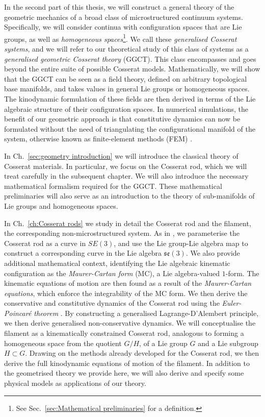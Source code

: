 \documentclass[]{cam-thesis}
\begin{document}
In the second part of this thesis, we will construct a general theory of the geometric mechanics of a broad class of microstructured continuum systems. Specifically, we will consider continua with configuration spaces that are Lie groups, as well as \textit{homogeneous spaces}\footnote{See Sec.~\ref{sec:Mathematical preliminaries} for a definition.}. We call these \textit{generalised Cosserat systems}, and we will refer to our theoretical study of this class of systems as a \textit{generalised geometric Cosserat theory} (GGCT). This class encompasses and goes beyond the entire suite of possible Cosserat models. Mathematically, we will show that the GGCT can be seen as a field theory, defined on arbitrary topological base manifolds, and takes values in general Lie groups or homogeneous spaces. The kinodynamic formulation of these fields are then derived in terms of the Lie algebraic structure of their configuration spaces. In numerical simulations, the benefit of our geometric approach is that constitutive dynamics can now be formulated without the need of triangulating the configurational manifold of the system, otherwise known as finite-element methods (FEM) \citep{hughesFiniteElementMethod2012}. 

In Ch.~\ref{sec:geometry introduction} we will introduce the classical theory of Cosserat materials. In particular, we focus on the Cosserat rod, which we will treat carefully in the subsequent chapter. We will also introduce the necessary mathematical formalism required for the GGCT. These mathematical preliminaries will also serve as an introduction to the theory of sub-manifolds of Lie groups and homogeneous spaces.

In Ch.~\ref{ch:Cosserat rods} we study in detail the Cosserat rod and the filament, the corresponding non-microstructured system. As in \citep{giusteriSimulationViscoelasticCosserat2021, giusteriImportanceEffectivenessRepresenting, chirikjianStochasticElasticaExcludedVolume2008, holmMatrixGstrands2014}, we parameterise the Cosserat rod as a curve in $SE(3)$, and use the Lie group-Lie algebra map to construct a corresponding curve in the Lie algebra $\mathfrak{se}(3)$. We also provide additional mathematical context, identifying the Lie algebraic kinematic configuration as the \textit{Maurer-Cartan form} (MC), a Lie algebra-valued $1$-form. The kinematic equations of motion are then found as a result of the \textit{Maurer-Cartan equations}, which enforce the integrability of the MC form. We then derive the conservative and constitutive dynamics of the Cosserat rod using the \textit{Euler-Poincar\'e theorem} \citep{marsdenIntroductionMechanicsSymmetry2013, marleHenriPoincareNote2013a}. By constructing a generalised Lagrange-D'Alembert principle, we then derive generalised non-conservative dynamics. We will conceptualise the filament as a kinematically constrained Cosserat rod, analogous to forming a homogeneous space from the quotient $G/H$, of a Lie group $G$ and a Lie subgroup $H \subset G$. Drawing on the methods already developed for the Cosserat rod, we then derive the full kinodynamic equations of motion of the filament. In addition to the geometrised theory we provide here, we will also derive and specify some physical models as applications of our theory.
\end{document}
